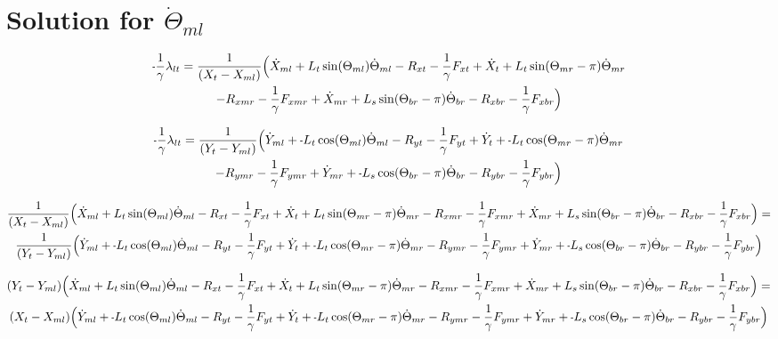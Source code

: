 \documentclass[11pt, landscape]{article}
\newcommand{\mn}{\scalebox{0.7}[1.0]{-}}
\begin{document}
\section{Solution for $\dot{\Theta}_{ml}$}

\begin{multline}
\mn\frac{1}{\gamma}\lambda_{lt} =
\frac{1}{(X_{t } - X_{ml})} \Big( \dot{X}_{ml} + L_{t}\sin(\Theta_{ml})      \dot{\Theta}_{ml} - R_{xt } - \frac{1}{\gamma}F_{xt } + \dot{X}_{t } + L_{t}\sin(\Theta_{mr}-\pi)  \dot{\Theta}_{mr} \\
- R_{xmr} - \frac{1}{\gamma}F_{xmr} + \dot{X}_{mr} + L_{s}\sin(\Theta_{br}-\pi)  \dot{\Theta}_{br} - R_{xbr} - \frac{1}{\gamma}F_{xbr} \Big)
\end{multline}

\begin{multline}
\mn\frac{1}{\gamma}\lambda_{lt} =
\frac{1}{(Y_{t } - Y_{ml})} \Big( \dot{Y}_{ml} + \mn L_{t}\cos(\Theta_{ml})      \dot{\Theta}_{ml} - R_{yt} - \frac{1}{\gamma}F_{yt } + \dot{Y}_{t } + \mn L_{t}\cos(\Theta_{mr}-\pi)  \dot{\Theta}_{mr} \\
- R_{ymr} - \frac{1}{\gamma}F_{ymr} + \dot{Y}_{mr} + \mn L_{s}\cos(\Theta_{br}-\pi)  \dot{\Theta}_{br} - R_{ybr} - \frac{1}{\gamma}F_{ybr}\Big)
\end{multline}

\begin{multline}
\frac{1}{(X_{t } - X_{ml})} \Big( \dot{X}_{ml} + L_{t}\sin(\Theta_{ml})      \dot{\Theta}_{ml} - R_{xt } - \frac{1}{\gamma}F_{xt } + \dot{X}_{t } + L_{t}\sin(\Theta_{mr}-\pi)  \dot{\Theta}_{mr}
- R_{xmr} - \frac{1}{\gamma}F_{xmr} + \dot{X}_{mr} + L_{s}\sin(\Theta_{br}-\pi)  \dot{\Theta}_{br} - R_{xbr} - \frac{1}{\gamma}F_{xbr} \Big) = \\
\frac{1}{(Y_{t } - Y_{ml})} \Big( \dot{Y}_{ml} + \mn L_{t}\cos(\Theta_{ml})      \dot{\Theta}_{ml} - R_{yt} - \frac{1}{\gamma}F_{yt } + \dot{Y}_{t } + \mn L_{t}\cos(\Theta_{mr}-\pi)  \dot{\Theta}_{mr}
- R_{ymr} - \frac{1}{\gamma}F_{ymr} + \dot{Y}_{mr} + \mn L_{s}\cos(\Theta_{br}-\pi)  \dot{\Theta}_{br} - R_{ybr} - \frac{1}{\gamma}F_{ybr}\Big)
\end{multline}

\begin{multline}
(Y_{t } - Y_{ml}) \Big( \dot{X}_{ml} + L_{t}\sin(\Theta_{ml}) \dot{\Theta}_{ml} - R_{xt } - \frac{1}{\gamma}F_{xt } + \dot{X}_{t } + L_{t}\sin(\Theta_{mr}-\pi)  \dot{\Theta}_{mr}
- R_{xmr} - \frac{1}{\gamma}F_{xmr} + \dot{X}_{mr} + L_{s}\sin(\Theta_{br}-\pi)  \dot{\Theta}_{br} - R_{xbr} - \frac{1}{\gamma}F_{xbr} \Big) = \\
(X_{t } - X_{ml}) \Big( \dot{Y}_{ml} + \mn L_{t}\cos(\Theta_{ml}) \dot{\Theta}_{ml} - R_{yt} - \frac{1}{\gamma}F_{yt } + \dot{Y}_{t } + \mn L_{t}\cos(\Theta_{mr}-\pi)  \dot{\Theta}_{mr}
- R_{ymr} - \frac{1}{\gamma}F_{ymr} + \dot{Y}_{mr} + \mn L_{s}\cos(\Theta_{br}-\pi)  \dot{\Theta}_{br} - R_{ybr} - \frac{1}{\gamma}F_{ybr}\Big)
\end{multline}
\end{document}
